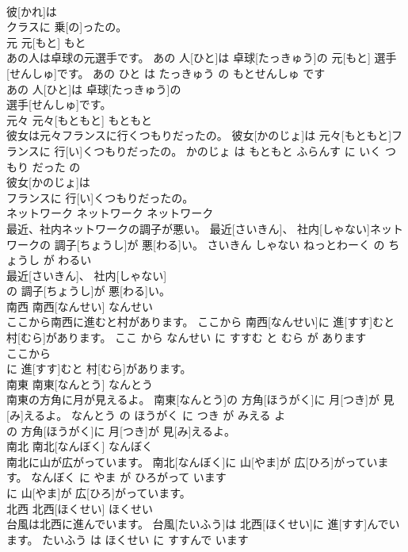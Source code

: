 \documentclass[8pt]{extreport}
\begin{document}
\begin{CJK}{UTF8}{min}
\\	彼[かれ]は
\\	クラスに 乗[の]ったの。			
\\	元	元[もと]	もと	
\\	あの人は卓球の元選手です。	あの 人[ひと]は 卓球[たっきゅう]の 元[もと] 選手[せんしゅ]です。	あの ひと は たっきゅう の もとせんしゅ です	
\\	あの 人[ひと]は 卓球[たっきゅう]の
\\	選手[せんしゅ]です。			
\\	元々	元々[もともと]	もともと	
\\	彼女は元々フランスに行くつもりだったの。	彼女[かのじょ]は 元々[もともと]フランスに 行[い]くつもりだったの。	かのじょ は もともと ふらんす に いく つもり だった の	
\\	彼女[かのじょ]は
\\	フランスに 行[い]くつもりだったの。			
\\	ネットワーク	ネットワーク	ネットワーク	
\\	最近、社内ネットワークの調子が悪い。	最近[さいきん]、 社内[しゃない]ネットワークの 調子[ちょうし]が 悪[わる]い。	さいきん しゃない ねっとわーく の ちょうし が わるい	
\\	最近[さいきん]、 社内[しゃない]
\\	の 調子[ちょうし]が 悪[わる]い。			
\\	南西	南西[なんせい]	なんせい	
\\	ここから南西に進むと村があります。	ここから 南西[なんせい]に 進[すす]むと 村[むら]があります。	ここ から なんせい に すすむ と むら が あります	
\\	ここから
\\	に 進[すす]むと 村[むら]があります。			
\\	南東	南東[なんとう]	なんとう	
\\	南東の方角に月が見えるよ。	南東[なんとう]の 方角[ほうがく]に 月[つき]が 見[み]えるよ。	なんとう の ほうがく に つき が みえる よ	
\\	の 方角[ほうがく]に 月[つき]が 見[み]えるよ。			
\\	南北	南北[なんぼく]	なんぼく	
\\	南北に山が広がっています。	南北[なんぼく]に 山[やま]が 広[ひろ]がっています。	なんぼく に やま が ひろがって います	
\\	に 山[やま]が 広[ひろ]がっています。			
\\	北西	北西[ほくせい]	ほくせい	
\\	台風は北西に進んでいます。	台風[たいふう]は 北西[ほくせい]に 進[すす]んでいます。	たいふう は ほくせい に すすんで います	

\end{CJK}
\end{document}
